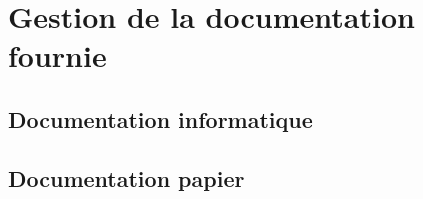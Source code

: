 \section{Gestion de la documentation fournie}
\subsection{Documentation informatique}
\subsection{Documentation papier}
